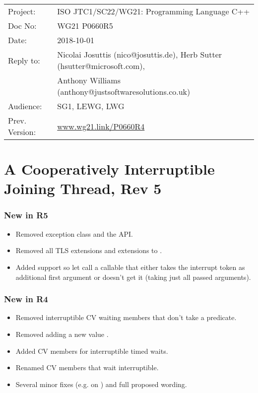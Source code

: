 
{\small
\begin{tabular}{@{}ll}
Project:  	& ISO JTC1/SC22/WG21: Programming Language C++ \\
Doc No: 	& WG21 P0660R5 \\
Date: 		& 2018-10-01 \\
Reply to: 	& Nicolai Josuttis (nico@josuttis.de), Herb Sutter (hsutter@microsoft.com), \\
                &         Anthony Williams (anthony@justsoftwaresolutions.co.uk) \\
Audience: 	& SG1, LEWG, LWG \\
Prev. Version:	& \url{www.wg21.link/P0660R4} \\
\end{tabular}
}

\section*{{\huge{}A Cooperatively Interruptible Joining Thread, Rev 5}}

\subsubsection*{New in R5}
\begin{itemize}
 \item Removed exception class  and the  API.
 \item Removed all TLS extensions and extensions to .
 \item Added support so let  call a callable that
        either takes the interrupt token as additional first argument
        or doesn't get it (taking just all passed arguments).
\end{itemize}

\subsubsection*{New in R4}
\begin{itemize}
 \item Removed interruptible CV waiting members that don't take a predicate.
 \item Removed adding a new  value .
 \item Added CV members for interruptible timed waits.
 \item Renamed CV members that wait interruptible.
 \item Several minor fixes (e.g. on ) and full proposed wording.
\end{itemize}

